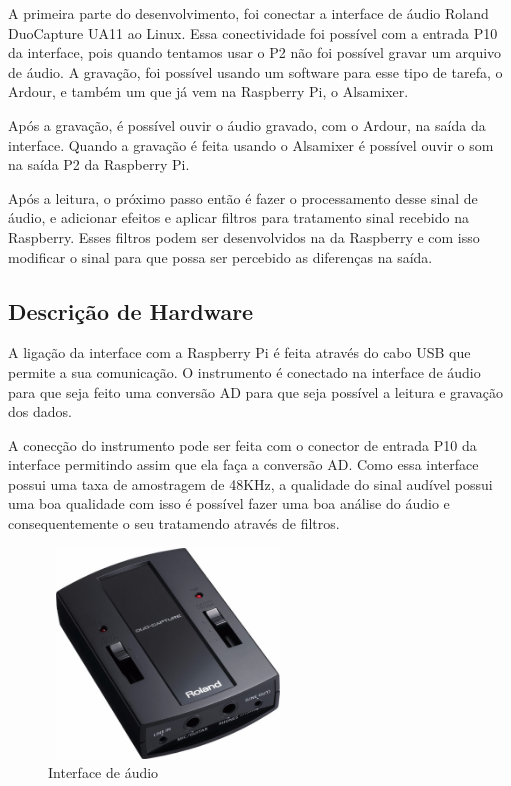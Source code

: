 \documentclass[conference]{IEEEtran}
\begin{document}
A primeira parte do desenvolvimento, foi conectar a interface de áudio Roland DuoCapture UA11 ao Linux. 
Essa conectividade foi possível com a entrada P10 da interface, pois quando tentamos usar o P2 não foi possível gravar um arquivo de áudio. A gravação, foi possível usando um software para esse tipo de tarefa, o Ardour, e também um que já vem na Raspberry Pi, o Alsamixer.

Após a gravação, é possível ouvir o áudio gravado, com o Ardour, na saída da interface. Quando a gravação é feita usando o Alsamixer é possível ouvir o som na saída P2 da Raspberry Pi. 

Após a leitura, o próximo passo então é fazer o processamento desse sinal de áudio, e adicionar efeitos e aplicar filtros para tratamento sinal recebido na Raspberry. Esses filtros podem ser desenvolvidos na da Raspberry e com isso modificar o sinal para que possa ser percebido as diferenças na saída.

\subsection{Descrição de Hardware}

A ligação da interface com a Raspberry Pi é feita através do cabo USB que permite a sua comunicação. O instrumento é conectado na interface de áudio para que seja feito uma conversão AD para que seja possível a leitura e gravação dos dados. 

A conecção do instrumento pode ser feita com o conector de entrada P10 da interface permitindo assim que ela faça a conversão AD. Como essa interface possui uma taxa de amostragem de 48KHz, a qualidade do sinal audível possui uma boa qualidade com isso é possível fazer uma boa análise do áudio e consequentemente o seu tratamendo através de filtros.

\begin{figure}[!htb]
\centering
\includegraphics[width=2.5in, height=2.2in]{Imagens/interface}
\caption{Interface de áudio} 
\label{interface}
\end{figure}
\end{document}
